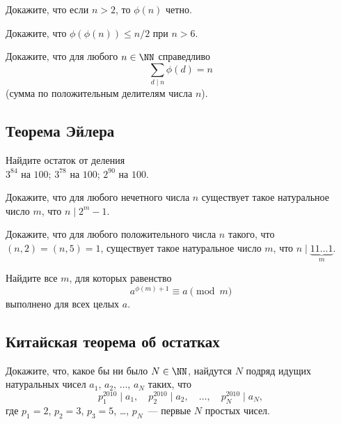 \begin{problems}
\item
Докажите, что если $n > 2$, то $\phi(n)$ четно.

\item
Докажите, что $\phi(\phi(n)) \leq n/2$ при $n > 6$.

\item
Докажите, что для любого $n \in \NN$ справедливо
\[
    \sum_{d \mid n}
        \phi(d)
=
    n
\]
(сумма по положительным делителям числа $n$).

\end{problems}


\subsection*{Теорема Эйлера}

\begin{problems}

\item
Найдите остаток от деления
\\
\sbp $3^{84}$ на $100$;
\quad
\sbp $3^{78}$ на $100$;
\quad
\sbp $2^{90}$ на $100$.

\item
Докажите, что для любого нечетного числа $n$ существует такое натуральное число
$m$, что $n \mid 2^m - 1$.

\item
Докажите, что для любого положительного числа $n$ такого, что
$(n, 2) = (n, 5) = 1$,
существует такое натуральное число $m$, что
\(
    n
\mid
    \underbrace{11\ldots1}_{m}
\).

\item
Найдите все $m$, для которых равенство
\[
    a^{\phi(m) + 1}
\equiv
    a \pmod m
\]
выполнено для всех целых $a$.

\end{problems}


\subsection*{Китайская теорема об остатках}

\begin{problems}

\item
Докажите, что, какое бы ни было $N \in \NN$, найдутся $N$ подряд идущих
натуральных чисел
$a_1$, $a_2$, $\ldots$, $a_N$
таких, что
\[
    p_1^{2010} \mid a_1
,\quad
    p_2^{2010} \mid a_2
,\quad
\ldots
,\quad
    p_N^{2010} \mid a_N
,\]
где $p_1 = 2$, $p_2 = 3$, $p_3 = 5$, \ldots, $p_N$~--- первые $N$ простых
чисел.

\end{problems}

